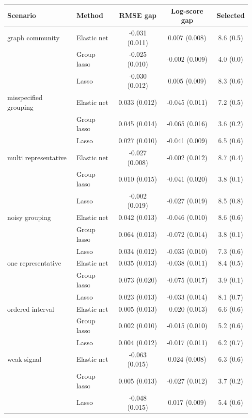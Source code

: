 \begin{tabular}{llccc}
\toprule
Scenario & Method & RMSE gap & Log-score gap & Selected \\
\midrule
graph community & Elastic net & -0.031 (0.011) & 0.007 (0.008) & 8.6 (0.5) \\
 & Group lasso & -0.025 (0.010) & -0.002 (0.009) & 4.0 (0.0) \\
 & Lasso & -0.030 (0.012) & 0.005 (0.009) & 8.3 (0.6) \\
\addlinespace
misspecified grouping & Elastic net & 0.033 (0.012) & -0.045 (0.011) & 7.2 (0.5) \\
 & Group lasso & 0.045 (0.014) & -0.065 (0.016) & 3.6 (0.2) \\
 & Lasso & 0.027 (0.010) & -0.041 (0.009) & 6.5 (0.6) \\
\addlinespace
multi representative & Elastic net & -0.027 (0.008) & -0.002 (0.012) & 8.7 (0.4) \\
 & Group lasso & 0.010 (0.015) & -0.041 (0.020) & 3.8 (0.1) \\
 & Lasso & -0.002 (0.019) & -0.027 (0.019) & 8.5 (0.8) \\
\addlinespace
noisy grouping & Elastic net & 0.042 (0.013) & -0.046 (0.010) & 8.6 (0.6) \\
 & Group lasso & 0.064 (0.013) & -0.072 (0.014) & 3.8 (0.1) \\
 & Lasso & 0.034 (0.012) & -0.035 (0.010) & 7.3 (0.6) \\
\addlinespace
one representative & Elastic net & 0.035 (0.013) & -0.038 (0.011) & 8.4 (0.5) \\
 & Group lasso & 0.073 (0.020) & -0.075 (0.017) & 3.9 (0.1) \\
 & Lasso & 0.023 (0.013) & -0.033 (0.014) & 8.1 (0.7) \\
\addlinespace
ordered interval & Elastic net & 0.005 (0.013) & -0.020 (0.013) & 6.6 (0.6) \\
 & Group lasso & 0.002 (0.010) & -0.015 (0.010) & 5.2 (0.6) \\
 & Lasso & 0.004 (0.012) & -0.017 (0.011) & 6.2 (0.7) \\
\addlinespace
weak signal & Elastic net & -0.063 (0.015) & 0.024 (0.008) & 6.3 (0.6) \\
 & Group lasso & 0.005 (0.013) & -0.027 (0.012) & 3.7 (0.2) \\
 & Lasso & -0.048 (0.015) & 0.017 (0.009) & 5.4 (0.6) \\
\bottomrule
\end{tabular}
